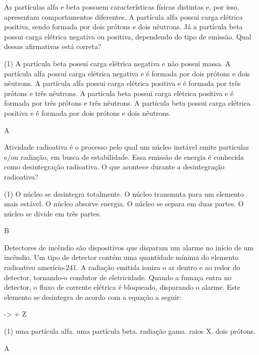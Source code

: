 \documentclass[9 pt]{scrartcl}
\def\PQ{0.84} %
\begin{document}
\begin{exercise}[points=\PQ]
As partículas alfa e beta possuem características físicas distintas e, por isso, apresentam comportamentos diferentes. A partícula alfa possui carga elétrica positiva, sendo formada por dois prótons e dois nêutrons. Já a partícula beta possui carga elétrica negativa ou positiva, dependendo do tipo de emissão. Qual dessas afirmativas está correta?

\begin{choice}(1)
\choice A partícula beta possui carga elétrica negativa e não possui massa.
\choice A partícula alfa possui carga elétrica negativa e é formada por dois prótons e dois nêutrons.
\choice A partícula alfa possui carga elétrica positiva e é formada por três prótons e três nêutrons.
\choice A partícula beta possui carga elétrica positiva e é formada por três prótons e três nêutrons.
\choice A partícula beta possui carga elétrica positiva e é formada por dois prótons e dois nêutrons.
\end{choice}
\end{exercise}
\begin{solution}
A
\end{solution}




\begin{exercise}[points=\PQ]
Atividade radioativa é o processo pelo qual um núcleo instável emite partículas e/ou radiação, em busca de estabilidade. Essa emissão de energia é conhecida como desintegração radioativa. O que acontece durante a desintegração radioativa?

\begin{choice}(1)
\choice O núcleo se desintegra totalmente.
\choice O núcleo transmuta para um elemento mais estável.
\choice O núcleo absorve energia.
\choice O núcleo se separa em duas partes.
\choice O núcleo se divide em três partes.
\end{choice}
\end{exercise}
\begin{solution}
B
\end{solution}


\begin{exercise}[points=\PQ]
Detectores de incêndio são dispositivos que disparam um alarme no início de um incêndio. Um tipo de detector contém uma quantidade mínima do elemento radioativo amerício-241. A radiação emitida ioniza o ar dentro e ao redor do detector, tornando-o condutor de eletricidade. Quando a fumaça entra no detector, o fluxo de corrente elétrica é bloqueado, disparando o alarme. Este elemento se desintegra de acordo com a equação a seguir:

\begin{reaction*}
 ->  + Z
\end{reaction*}

\begin{choice}(1)
\choice uma partícula alfa.
\choice uma partícula beta.
\choice radiação gama.
\choice raios X.
\choice dois prótons.
\end{choice}
\end{exercise}
\begin{solution}
A
\end{solution}
\end{document}
